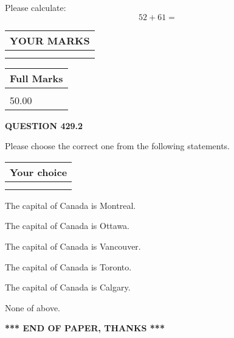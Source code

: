 \documentclass[12pt]{article}
\begin{document}
  
 
Please calculate:
\begin{equation}
52 +  %
61 = \nonumber
\end{equation}
 

 

 
  
\vspace{0.2in}
  
\noindent\begin{tabular}{|l|}
\hline
 YOUR MARKS  \\
\hline
 \\ 
 \\ 
\hline
\end{tabular}
\hspace{0.05in} \begin{tabular}{|l|}
\hline
 Full Marks  \\
\hline
 \\ 
50.00 \\
\hline
\end{tabular}
{\textbf{\Large{QUESTION
429.2 
}}}
  
  
Please choose the correct one from the following statements.
  
  
\noindent\hspace{3.0in} \begin{tabular}{|l|}
\hline
Your choice \\
\hline
 \\ 
 \\ 
\hline
\end{tabular}
  
  
 
 
The capital of Canada is Montreal.
 
 
The capital of Canada is Ottawa.
 
 
The capital of Canada is Vancouver.
 
 
The capital of Canada is Toronto.
 
 
The capital of Canada is Calgary.
 
 
 None of above.
 
 
   
   
 \vspace{0.2in}
 
   
   
   
   
\vspace{1.0in} 
{\textbf{\large{ *** END OF PAPER, THANKS *** }}} 
   
\end{document}

